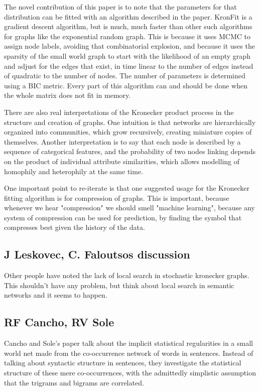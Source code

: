 \documentclass[12pt]{article}
\begin{document}
The novel contribution of this paper is to note that the parameters for that distribution can be fitted with an algorithm described in the paper. KronFit is a gradient descent algorithm, but is much, much faster than other such algorithms for graphs like the exponential random graph. This is because it uses MCMC to assign node labels, avoiding that combinatorial explosion, and because it uses the sparsity of the small world graph to start with the likelihood of an empty graph and adjust for the edges that exist, in time linear to the number of edges instead of quadratic to the number of nodes. The number of parameters is determined using a BIC metric. Every part of this algorithm can and should be done when the whole matrix does not fit in memory.

There are also real interpretations of the Kronecker product process in the structure and creation of graphs. One intuition is that networks are hierarchically organized into communities, which grow recursively, creating miniature copies of themselves. Another interpretation is to say that each node is described by a sequence of categorical features, and the probability of two nodes linking depends on the product of individual attribute similarities, which allows modelling of homophily and heterophily at the same time.

One important point to re-iterate is that one suggested usage for the Kronecker fitting algorithm is for compression of graphs. This is important, because whenever we hear "compression" we should smell "machine learning", because any system of compression can be used for prediction, by finding the symbol that compresses best given the history of the data.
\subsection{J Leskovec, C. Faloutsos discussion}

Other people have noted the lack of local search in stochastic kronecker graphs. This shouldn't have any problem, but think about local search in semantic networks and it seems to happen.

\subsection{RF Cancho, RV Sole}
Cancho and Sole's paper talk about the implicit statistical regularities in a small world net made from the co-occurrence network of words in sentences. Instead of talking about syntactic structure in sentences, they investigate the statistical structure of these mere co-occurrences, with the admittedly simplistic assumption that the trigrams and bigrams are correlated.
\end{document}
